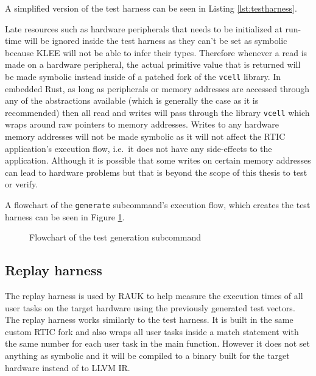 A simplified version of the test harness can be seen in Listing
\ref{lst:testharness}.



Late resources such as hardware peripherals that needs to be initialized at
run-time will be ignored inside the test harness as they can't be set as
symbolic because KLEE will not be able to infer their types. Therefore whenever
a read is made on a hardware peripheral, the actual primitive value that is
returned will be made symbolic instead inside of a patched fork of the
\texttt{vcell} library. In embedded Rust, as long as peripherals or memory
addresses are accessed through any of the abstractions available (which is
generally the case as it is recommended) then all read and writes will pass
through the library \texttt{vcell} which wraps around raw pointers to memory
addresses. Writes to any hardware memory addresses will not be made symbolic as
it will not affect the RTIC application's execution flow, i.e.\ it does not
have any side-effects to the application. Although it is possible that some
writes on certain memory addresses can lead to hardware problems but that is
beyond the scope of this thesis to test or verify.

A flowchart of the \texttt{generate} subcommand's execution flow, which creates
the test harness can be seen in Figure \ref{fig:generatecmd}.
\begin{figure}[H]
    \centering
    \caption{Flowchart of the test generation subcommand}
    \label{fig:generatecmd}
\end{figure}

\subsection{Replay harness}
The replay harness is used by RAUK to help measure the execution times of all
user tasks on the target hardware using the previously generated test vectors.
The replay harness works similarly to the test harness. It is built in the same
custom RTIC fork and also wraps all user tasks inside a match statement with
the same number for each user task in the main function. However it does not
set anything as symbolic and it will be compiled to a binary built for the
target hardware instead of to LLVM IR.

